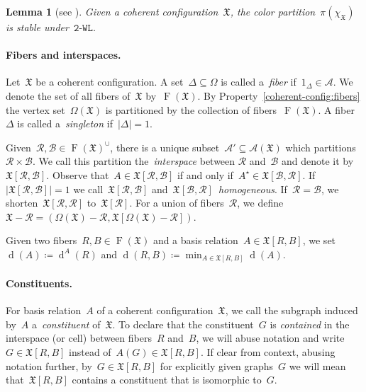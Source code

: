 \documentclass[english,a4paper]{article}
\theoremstyle{plain}
\newtheorem{lemma}      [theorem]{Lemma}
\theoremstyle{definition}
\newcommand{\abs}[1]{| #1 |}
\DeclareMathOperator{\Fibers}{F}
\newcommand{\coherentConfig}{\ensuremath{\mathfrak{X}}}
\newcommand{\fibers}[1]{\ensuremath{\Fibers \left( #1 \right)}}
\newcommand{\interspace}[2]{\ensuremath{\coherentConfig[#1,#2]}}
\newcommand{\inducedCC}[1]{\ensuremath{\coherentConfig[#1]}}
\newcommand{\intDegree}[1]{\ensuremath{\Deg \left( #1 \right)}}
\newcommand{\minimalDegree}[2]{\Deg(#1,#2)}
\newcommand{\vertices}{\ensuremath{\Omega}}
\newcommand{\relations}{\ensuremath{\mathcal{A}}}
\newcommand{\arcs}{\ensuremath{A}}
\newcommand{\wld}[1]{\texttt{#1-WL}}
\newcommand{\coloring}{\ensuremath{\chi}}
\DeclareMathOperator{\Deg}{d}
\newcommand{\degree}[3]{\Deg_{#1}^{#3}\left(#2\right)}
\begin{document}
\begin{lemma}[see \cite{DBLP:conf/stoc/Babai16}]
    Given a coherent configuration~$\coherentConfig$, the color partition~$\pi(\coloring_\coherentConfig)$ is stable under~$\wld{2}$.
\end{lemma}



\paragraph{Fibers and interspaces.}
Let~$\coherentConfig$ be a coherent configuration.
A set~$\Delta \subseteq \vertices$ is called a~\emph{fiber} if~$1_\Delta \in \relations$. We denote the set of all fibers of~$\coherentConfig$ by~$\fibers{\coherentConfig}$.
By Property~\ref{coherent-config:fibers} the vertex set~$\vertices(\coherentConfig)$ is partitioned by the collection of fibers~$\fibers{\coherentConfig}$.
A fiber~$\Delta$ is called a~\emph{singleton} if~$\abs{\Delta} = 1$.

Given~$\mathcal{R},\mathcal{B} \in \fibers{\coherentConfig}^\cup$, there is a unique subset~$\relations' \subseteq \relations(\coherentConfig)$ which partitions~$\mathcal{R} \times \mathcal{B}$.
We call this partition the~\emph{interspace} between $\mathcal{R}$ and~$\mathcal{B}$ and denote it by~$\interspace{\mathcal{R}}{\mathcal{B}}$.
Observe that~$\arcs \in \interspace{\mathcal{R}}{\mathcal{B}}$ if and only if~$\arcs^\star \in \interspace{\mathcal{B}}{\mathcal{R}}$.
If~$\abs{\interspace{\mathcal{R}}{\mathcal{B}}} = 1$ we call~$\interspace{\mathcal{R}}{\mathcal{B}}$ and~$\interspace{\mathcal{B}}{\mathcal{R}}$~\emph{homogeneous}.
If~$\mathcal{R} = \mathcal{B}$, we shorten~$\interspace{\mathcal{R}}{\mathcal{R}}$ to~$\inducedCC{\mathcal{R}}$.
For a union of fibers~$\mathcal{R}$, we define~$\coherentConfig - \mathcal{R} = (\vertices(\coherentConfig) - \mathcal{R}, \coherentConfig[\vertices(\coherentConfig) - \mathcal{R}])$.

Given two fibers~$R,B \in \fibers{\coherentConfig}$ and a basis relation~$\arcs \in \interspace{R}{B}$, we set $\intDegree{\arcs} \coloneqq \degree{}{R}{A}$ and
$\minimalDegree{R}{B} \coloneqq \min_{\arcs \in \interspace{R}{B}} \intDegree{A}$.



\paragraph{Constituents.}
For basis relation~$\arcs$ of a coherent configuration~$\coherentConfig$, we call the subgraph induced by~$\arcs$ a~\emph{constituent} of~$\coherentConfig$.
To declare that the constituent~$G$ is \emph{contained} in the interspace (or cell) between fibers~$R$ and~$B$, we will abuse notation and write~$G \in \interspace{R}{B}$ instead of~$\arcs(G) \in \interspace{R}{B}$. If clear from context, abusing notation further, by~$G\in \interspace{R}{B}$ for explicitly given graphs~$G$ we will mean that~$\interspace{R}{B}$ contains a constituent that is isomorphic to~$G$.
\end{document}
